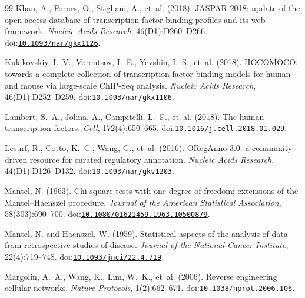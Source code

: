 \documentclass[11pt,a4paper]{article}
\begin{document}
\begin{thebibliography}{99}
Khan, A., Fornes, O., Stigliani, A., et~al. (2018).
\newblock JASPAR 2018: update of the open-access database of transcription factor binding profiles and its web framework.
\newblock \emph{Nucleic Acids Research}, 46(D1):D260--D266.
\newblock doi:\href{https://doi.org/10.1093/nar/gkx1126}{\nolinkurl{10.1093/nar/gkx1126}}.

Kulakovskiy, I.~V., Vorontsov, I.~E., Yevshin, I.~S., et~al. (2018).
\newblock HOCOMOCO: towards a complete collection of transcription factor binding models for human and mouse via large-scale ChIP-Seq analysis.
\newblock \emph{Nucleic Acids Research}, 46(D1):D252--D259.
\newblock doi:\href{https://doi.org/10.1093/nar/gkx1106}{\nolinkurl{10.1093/nar/gkx1106}}.

Lambert, S.~A., Jolma, A., Campitelli, L.~F., et~al. (2018).
\newblock The human transcription factors.
\newblock \emph{Cell}, 172(4):650--665.
\newblock doi:\href{https://doi.org/10.1016/j.cell.2018.01.029}{\nolinkurl{10.1016/j.cell.2018.01.029}}.

Lesurf, R., Cotto, K.~C., Wang, G., et~al. (2016).
\newblock ORegAnno 3.0: a community-driven resource for curated regulatory annotation.
\newblock \emph{Nucleic Acids Research}, 44(D1):D126--D132.
\newblock doi:\href{https://doi.org/10.1093/nar/gkv1203}{\nolinkurl{10.1093/nar/gkv1203}}.

Mantel, N. (1963).
\newblock Chi-square tests with one degree of freedom; extensions of the {Mantel--Haenszel} procedure.
\newblock \emph{Journal of the American Statistical Association}, 58(303):690--700.
\newblock doi:\href{https://doi.org/10.1080/01621459.1963.10500879}{\nolinkurl{10.1080/01621459.1963.10500879}}.

Mantel, N. and Haenszel, W. (1959).
\newblock Statistical aspects of the analysis of data from retrospective studies of disease.
\newblock \emph{Journal of the National Cancer Institute}, 22(4):719--748.
\newblock doi:\href{https://doi.org/10.1093/jnci/22.4.719}{\nolinkurl{10.1093/jnci/22.4.719}}.

Margolin, A.~A., Wang, K., Lim, W.~K., et~al. (2006).
\newblock Reverse engineering cellular networks.
\newblock \emph{Nature Protocols}, 1(2):662--671.
\newblock doi:\href{https://doi.org/10.1038/nprot.2006.106}{\nolinkurl{10.1038/nprot.2006.106}}.


\end{thebibliography}
\end{document}
